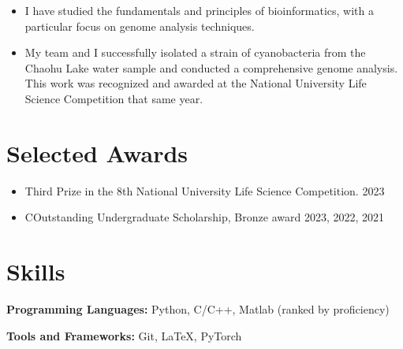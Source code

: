 \documentclass{resume}
\begin{document}
\begin{itemize}
\item I have studied the fundamentals and principles of bioinformatics, with a particular focus on genome analysis techniques.
\item My team and I successfully isolated a strain of cyanobacteria from the Chaohu Lake water sample and conducted a comprehensive genome analysis. This work was recognized and awarded at the National University Life Science Competition that same year.
\end{itemize}

\section{Selected Awards}
\begin{itemize}
    \item Third Prize in the 8th National University Life Science Competition. \hfill 2023
    \item COutstanding Undergraduate Scholarship, Bronze award 2023, 2022, 2021
\end{itemize}


\section{Skills}
\textbf{Programming Languages:} \small Python, C/C++, Matlab (ranked by proficiency)

\textbf{Tools and Frameworks:} \small Git, \LaTeX, PyTorch
\end{document}
